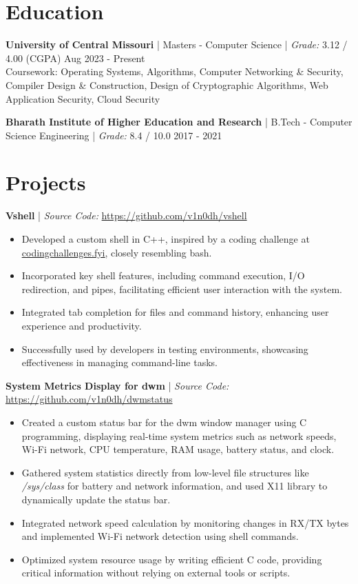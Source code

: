 \documentclass[9pt, letterpad]{extarticle}
\newcommand{\projsection}[2] {
	\raggedright{\normalsize\bfseries{#1}} | {\small \textit{Source Code:} \hspace{0.1em} \href{#2}{#2}}
}
\newcommand{\edusection}[5] {
	\normalsize{\textbf{#1} | {#3} | {#4}
	\hfill {\small #2} } \\
	{\small #5} }
\begin{document}
\section{Education}
\edusection
{University of Central Missouri}
{Aug 2023 {-} Present}
{Masters {-} Computer Science}
{\textit{Grade:} 3.12 / 4.00 (CGPA)}
{Coursework: Operating Systems, Algorithms, Computer Networking \& Security, Compiler Design \& Construction, Design of Cryptographic Algorithms, Web Application Security, Cloud Security}
\vspace*{0.5em}

\edusection
{Bharath Institute of Higher Education and Research}
{2017 {-} 2021}
{B.Tech {-} Computer Science Engineering}
{\textit{Grade:} 8.4 / 10.0}
{}

\section{Projects}
\projsection
{Vshell}
{https://github.com/v1n0dh/vshell}
\vspace*{-0.5em}
\begin{itemize}[leftmargin=6mm]
	\setlength\itemsep{0em}
	\item{Developed a custom shell in C++, inspired by a coding challenge at \href{https://codingchallenges.fyi/challenges/challenge-shell}{\underline {codingchallenges.fyi}}, closely resembling bash.}
	\item{Incorporated key shell features, including command execution, I/O redirection, and pipes, facilitating efficient user interaction with the system.}
	\item{Integrated tab completion for files and command history, enhancing user experience and productivity.}
	\item{Successfully used by developers in testing environments, showcasing effectiveness in managing command-line tasks.}
\end{itemize}

\projsection
{System Metrics Display for dwm}
{https://github.com/v1n0dh/dwmstatus}
\vspace*{-0.5em}
\begin{itemize}[leftmargin=6mm]
	\setlength\itemsep{0em}
	\item{Created a custom status bar for the dwm window manager using C programming, displaying real-time system metrics such as network speeds, Wi-Fi network, CPU temperature, RAM usage, battery status, and clock.}
	\item{Gathered system statistics directly from low-level file structures like \textit{/sys/class} for battery and network information, and used X11 library to dynamically update the status bar.}
	\item{Integrated network speed calculation by monitoring changes in RX/TX bytes and implemented Wi-Fi network detection using shell commands.}
	\item{Optimized system resource usage by writing efficient C code, providing critical information without relying on external tools or scripts.}
\end{itemize}
\end{document}
